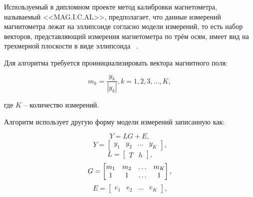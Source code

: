 Используемый в дипломном проекте метод калибровки магнетометра, называемый <<MAG.I.C.AL>>, предполагает, что данные измерений магнитометра
лежат на эллипсоиде согласно модели измерений, то есть набор векторов, представляющий измерения магнетометра по трём осям, 
имеет вид на трехмерной плоскости в виде эллипсоида ~\cite{magical}. %

Для алгоритма требуется проинициализировать вектора магнитного поля:

\begin{equation}
    \label{eq:domain:initMK}
    m_{k} = \frac{y_{k}}{\left|y_{k}\right|}, k=1,2,3,\dots ,K,
  \end{equation}
  \begin{explanationx}
    \item[где] $K$ -- количество измерений.
  \end{explanationx}

Алгоритм использует другую форму модели измерений записанную как:

\begin{equation}
    \label{eq:domain:updatedMagnetModel}
    Y = LG+E,
  \end{equation}
  \vspace{-1ex}
\begin{equation}
    \label{eq:domain:Y}
    Y = \begin{bmatrix}
        y_{1} & y_{2} & \dots & y_{K}
        \end{bmatrix}
        \text{,}
\end{equation}
\vspace{-1ex}
\begin{equation}
    \label{eq:domain:L}
    L = \begin{bmatrix}
        T & h
        \end{bmatrix}
        \text{,}
  \end{equation}
  \vspace{-1ex}
\begin{equation}
    \label{eq:domain:G}
    G = \begin{bmatrix}
        m_{1} & m_{2} & \dots & m_{K} \\
        1 & 1 & \dots & 1
        \end{bmatrix}
        \text{,}
        \vspace{-0.1ex}
  \end{equation}
\begin{equation}
    \label{eq:domain:E}
    E = \begin{bmatrix}
            e_{1} & e_{2} & \dots & e_{K}
        \end{bmatrix}
        \text{,}
  \end{equation}

